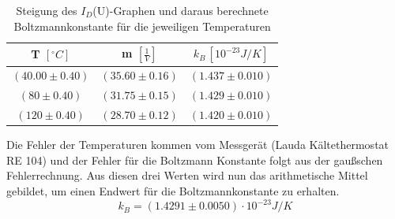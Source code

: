 \documentclass[a4paper,10pt,twocolumn]{scrartcl} %
\begin{document}
		\begin{table}[H]
		\centering
		\begin{tabular}{c|c|c}
		T $[^\circ C]$  	& m $[\frac{1}{V}]$		& $k_B \, [10^{-23} J/K]$\\
		\hline
  		$(40.00 \pm 0.40)$	& $(35.60 \pm 0.16)$	& $(1.437 \pm 0.010)$\\
		$(80 \pm 0.40)$			& $(31.75 \pm 0.15)$	& $(1.429 \pm 0.010)$\\
		$(120 \pm 0.40)$			& $(28.70 \pm 0.12)$	& $(1.420 \pm 0.010)$
		\end{tabular}
		\caption{Steigung des $I_D$(U)-Graphen und daraus berechnete Boltzmannkonstante für die jeweiligen Temperaturen}
		\end{table}
		\noindent Die Fehler der Temperaturen kommen vom Messgerät (Lauda Kältethermostat RE 104) und der Fehler für die Boltzmann Konstante folgt aus der gaußschen Fehlerrechnung.
		Aus diesen drei Werten wird nun das arithmetische Mittel gebildet, um einen Endwert für die Boltzmannkonstante zu erhalten.
		\begin{equation*}
			k_B = (1.4291 \pm 0.0050) \cdot 10^{-23} J/K
		\end{equation*}
		
		
\end{document}
